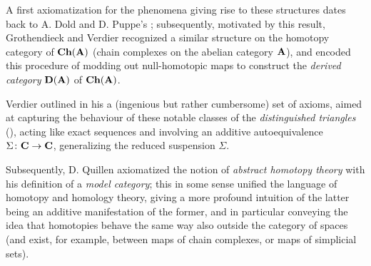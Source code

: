 A first axiomatization for the phenomena giving rise to these structures dates back to A\@. Dold and D\@. Puppe's \cite{Dold1961}; subsequently, motivated by this result, Grothendieck and Verdier recognized a similar structure on the homotopy category of $\textbf{Ch}(\textbf{A})$ (chain complexes on the abelian category $\textbf{A}$), and encoded this procedure of modding out null\hyp{}homotopic maps to construct the \emph{derived category} $\textbf{D}(\textbf{A})$ of $\textbf{Ch}(\textbf{A})$.

Verdier outlined in his \cite{VerdierDesDes} a (ingenious but rather cumbersome) set of axioms, aimed at capturing the behaviour of these notable classes of the \emph{distinguished triangles} (), acting like exact sequences and involving an additive autoequivalence $\Sigma \colon \textbf{C}\to \textbf{C}$,  generalizing the reduced suspension $\Sigma$.

Subsequently, D\@. Quillen axiomatized the notion of \emph{abstract homotopy theory} \cite{Baues1989} with his definition of a \emph{model category}; this in some sense unified the language of homotopy and homology theory, giving a more profound intuition of the latter being an additive manifestation of the former, and in particular conveying the idea that homotopies behave the same way also outside the category of spaces (and exist, for example, between maps of chain complexes, or maps of simplicial sets).

